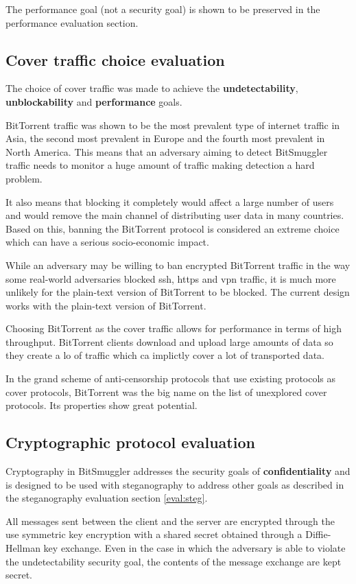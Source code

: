 \documentclass[11pt]{book} %
\newcommand{\projectName}{BitSmuggler }
\begin{document}
The performance goal (not a security goal) is shown to be preserved in the performance evaluation section.

\subsection {Cover traffic choice evaluation}
\label{subsec:bteval}
The choice of cover traffic was made to achieve the \textbf{undetectability}, \textbf{unblockability} and \textbf{performance} goals.

BitTorrent traffic was shown to be the most prevalent type of internet traffic in Asia, the second most prevalent in Europe and the fourth most prevalent in North America. This means that an adversary aiming to detect \projectName traffic needs to monitor a huge amount of traffic making detection a hard problem.

It also means that blocking it completely would affect a large number of users and would remove the main channel of distributing user data in many countries. Based on this, banning the BitTorrent protocol is considered an extreme choice which can have a serious socio-economic impact.

While an adversary may be willing to ban encrypted BitTorrent traffic in the way some real-world adversaries blocked ssh, https and vpn traffic, it is much more unlikely for the plain-text version of BitTorrent to be blocked. The current design works with the plain-text version of BitTorrent.

Choosing BitTorrent as the cover traffic allows for performance in terms of high throughput.  BitTorrent clients download and upload large amounts of data so they create a lo of traffic which ca implictly cover a lot of transported data.

In the grand scheme of anti-censorship protocols that use existing protocols as cover protocols, BitTorrent was the big name on the list of unexplored cover protocols. Its properties show great potential.

\subsection {Cryptographic protocol evaluation}
\label{subsec:cryptoEval}
Cryptography in \projectName addresses the security goals of \textbf{confidentiality} and is designed to be used with steganography to address other goals as described in the steganography evaluation section \ref{eval:steg}.

All messages sent between the client and the server are encrypted through the use symmetric key encryption with a shared secret obtained through a Diffie-Hellman key exchange. Even in the case in which the adversary is able to violate the undetectability security goal, the contents of the message exchange are kept secret.
\end{document}
